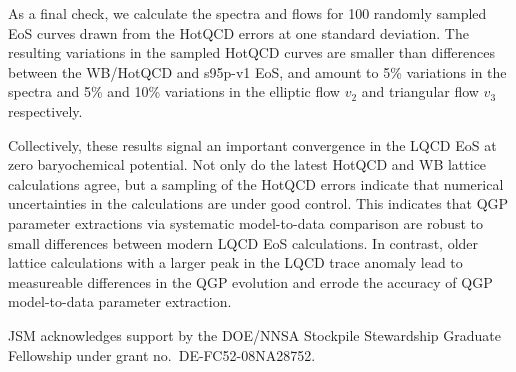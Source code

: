 \documentclass[aps,prc,reprint,amsmath,nofootinbib,superscriptaddress]{revtex4-1}
\begin{document}
As a final check, we calculate the spectra and flows for 100 randomly sampled EoS curves drawn from the HotQCD errors at one standard deviation. The resulting variations in the sampled HotQCD curves are smaller than differences between the WB/HotQCD and s95p-v1 EoS, and amount to 
5\% variations in the spectra and 5\% and 10\% variations in the elliptic flow $v_2$ and triangular flow $v_3$ respectively. 

Collectively, these results signal an important convergence in the LQCD EoS at zero baryochemical potential. Not only do the latest HotQCD and WB lattice calculations agree, but a sampling of the HotQCD errors indicate that numerical uncertainties in the calculations are under
good control. This indicates that QGP parameter extractions via systematic model-to-data comparison are robust to small differences between modern LQCD EoS calculations. In contrast, older lattice calculations with a larger peak in the LQCD trace anomaly lead to measureable differences in the QGP evolution and errode the accuracy of QGP model-to-data parameter extraction.

\begin{acknowledgments}
 JSM acknowledges support by the DOE/NNSA Stockpile Stewardship Graduate Fellowship under grant no.~DE-FC52-08NA28752.
\end{acknowledgments}


\end{document}
